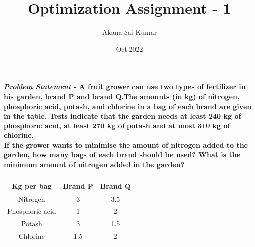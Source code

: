 \documentclass[journal,10pt,twocolumn]{article}
\title{\textbf{Optimization Assignment - 1}}
\author{Akana Sai Kumar}
\date{Oct 2022}
\begin{document}
\maketitle
\paragraph{\textit{Problem Statement} - A fruit grower can use two types of fertilizer in his garden, brand P and brand Q.The amounts (in kg) of nitrogen, phosphoric acid, potash, and chlorine in a bag of each brand are given in the table. Tests indicate that the garden needs at least 240 kg of phosphoric acid, at least 270 kg of potash and at most 310 kg of chlorine.\\
If the grower wants to minimise the amount of nitrogen added to the garden, how many bags of each brand should be used? What is the minimum amount of nitrogen added in the garden?} 
\vspace{1mm}
\begin{tabular}{|c|c|c|}
\hline
 Kg per bag & Brand P& Brand Q  \\ 
 \hline
 Nitrogen & 3 & 3.5 \\  
 \hline
 Phosphoric acid & 1  & 2 \\
 \hline
  Potash & 3 & 1.5 \\
 \hline
 Chlorine & 1.5 & 2\\
 \hline
\end{tabular} \\
\end{document}
